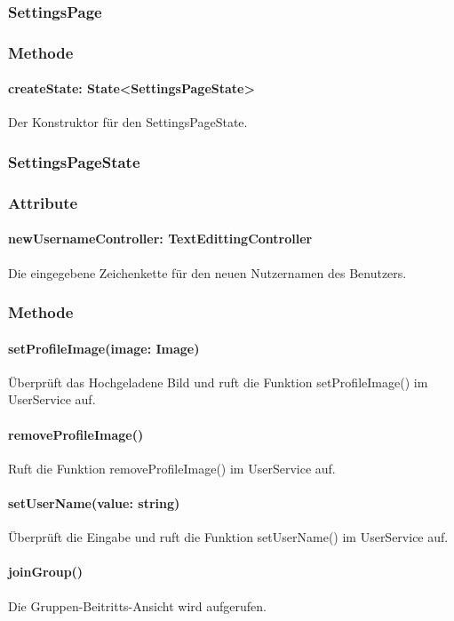\documentclass{entwurfsheft}
\begin{document}
\subsubsection{SettingsPage}\label{sec:SettingsPage}
\subsubsection*{Methode}
\paragraph*{createState: State<SettingsPageState>} Der Konstruktor für den SettingsPageState.

\subsubsection{SettingsPageState}\label{sec:SettingsPageState}
\subsubsection*{Attribute}
\paragraph*{newUsernameController: TextEdittingController} Die eingegebene Zeichenkette für den neuen Nutzernamen des Benutzers.

\subsubsection*{Methode}
\paragraph*{setProfileImage(image: Image)} Überprüft das Hochgeladene Bild und ruft die Funktion setProfileImage() im UserService auf.
\paragraph*{removeProfileImage()} Ruft die Funktion removeProfileImage() im UserService auf.
\paragraph*{setUserName(value: string)} Überprüft die Eingabe und ruft die Funktion setUserName() im UserService auf.
\paragraph*{joinGroup()} Die Gruppen-Beitritts-Ansicht wird aufgerufen.
\end{document}
